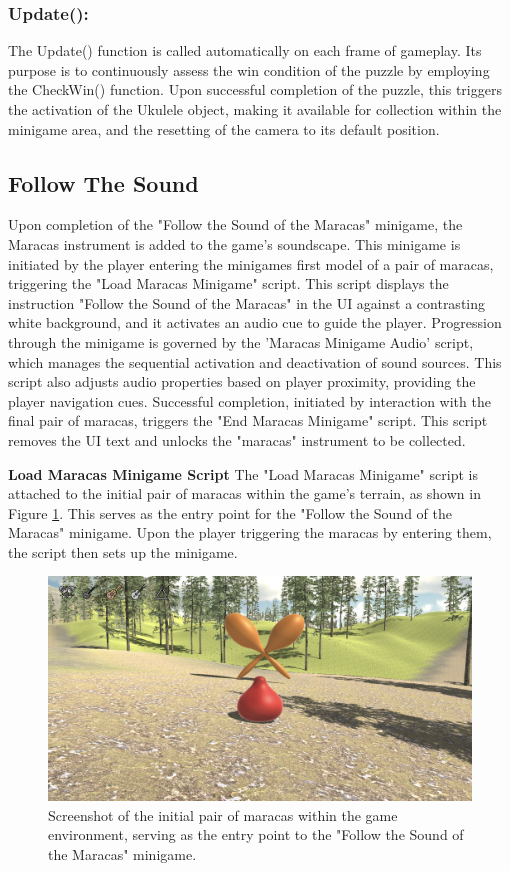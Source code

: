 \documentclass{l4proj}
\begin{document}
\subsubsection{Update():} The Update() function is called automatically on each frame of gameplay. Its purpose is to continuously assess the win condition of the puzzle by employing the CheckWin() function. Upon successful completion of the puzzle, this triggers the activation of the Ukulele object, making it available for collection within the minigame area, and the resetting of the camera to its default position.

\subsection{Follow The Sound}
Upon completion of the "Follow the Sound of the Maracas" minigame, the Maracas instrument is added to the game's soundscape. This minigame is initiated by the player entering the minigames first model of a pair of maracas, triggering the "Load Maracas Minigame" script. This script displays the instruction "Follow the Sound of the Maracas" in the UI against a contrasting white background, and it activates an audio cue to guide the player. Progression through the minigame is governed by the 'Maracas Minigame Audio' script, which manages the sequential activation and deactivation of sound sources. This script also adjusts audio properties based on player proximity, providing the player navigation cues. Successful completion, initiated by interaction with the final pair of maracas, triggers the "End Maracas Minigame" script. This script removes the UI text and unlocks the "maracas" instrument to be collected.
\newline

\textbf{Load Maracas Minigame Script} \newline
The "Load Maracas Minigame" script is attached to the initial pair of maracas within the game's terrain, as shown in Figure \ref{fig:maracas_trigger}. This serves as the entry point for the "Follow the Sound of the Maracas" minigame. Upon the player triggering the maracas by entering them, the script then sets up the minigame.

\begin{figure}[h]
 \centering
 \includegraphics[width=0.7\linewidth]{dissertation/images/Maracas_Trigger.png} 
 \caption{Screenshot of the initial pair of maracas within the game environment, serving as the entry point to the "Follow the Sound of the Maracas" minigame.} 
 \label{fig:maracas_trigger} 
\end{figure}
\end{document}
